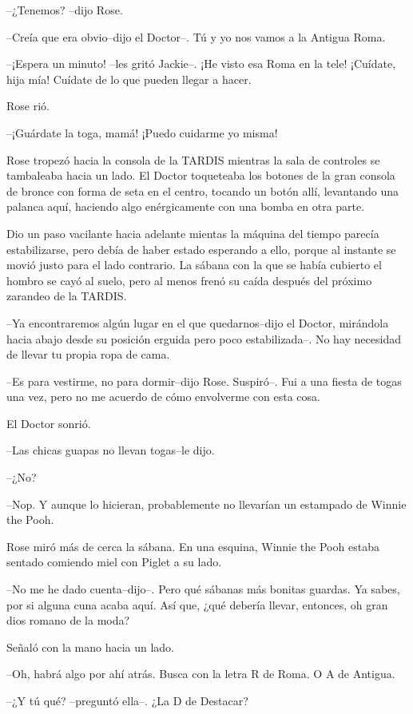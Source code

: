 --¿Tenemos? --dijo Rose.

--Creía que era obvio--dijo el Doctor--. Tú y yo nos vamos a la Antigua
Roma.

--¡Espera un minuto! --les gritó Jackie--. ¡He visto esa Roma en la
tele! ¡Cuídate, hija mía! Cuídate de lo que pueden llegar a hacer.

Rose rió.

--¡Guárdate la toga, mamá! ¡Puedo cuidarme yo misma!

Rose tropezó hacia la consola de la TARDIS mientras la sala de controles
se tambaleaba hacia un lado. El Doctor toqueteaba los botones de la gran
consola de bronce con forma de seta en el centro, tocando un botón allí,
levantando una palanca aquí, haciendo algo enérgicamente con una bomba
en otra parte.

Dio un paso vacilante hacia adelante mientas la máquina del tiempo
parecía estabilizarse, pero debía de haber estado esperando a ello,
porque al instante se movió justo para el lado contrario. La sábana con
la que se había cubierto el hombro se cayó al suelo, pero al menos frenó
su caída después del próximo zarandeo de la TARDIS.

--Ya encontraremos algún lugar en el que quedarnos--dijo el Doctor,
mirándola hacia abajo desde su posición erguida pero poco
estabilizada--. No hay necesidad de llevar tu propia ropa de cama.

--Es para vestirme, no para dormir--dijo Rose. Suspiró--. Fui a una
fiesta de togas una vez, pero no me acuerdo de cómo envolverme con esta
cosa.

El Doctor sonrió.

--Las chicas guapas no llevan togas--le dijo.

--¿No?

--Nop. Y aunque lo hicieran, probablemente no llevarían un estampado de
Winnie the Pooh.

Rose miró más de cerca la sábana. En una esquina, Winnie the Pooh estaba
sentado comiendo miel con Piglet a su lado.

--No me he dado cuenta--dijo--. Pero qué sábanas más bonitas guardas. Ya
sabes, por si alguna cuna acaba aquí. Así que, ¿qué debería llevar,
entonces, oh gran dios romano de la moda?

Señaló con la mano hacia un lado.

--Oh, habrá algo por ahí atrás. Busca con la letra R de Roma. O A de
Antigua.

--¿Y tú qué? --preguntó ella--. ¿La D de Destacar?

